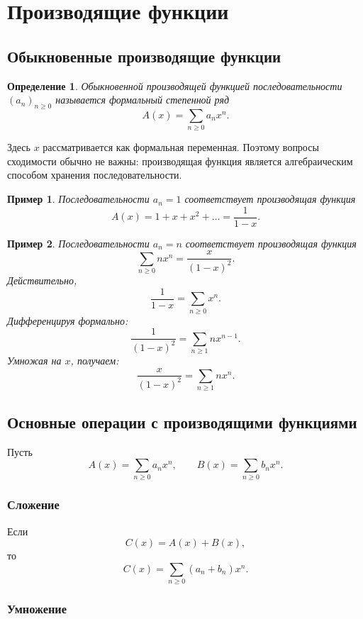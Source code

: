 \documentclass[12pt,a4paper]{article}
\newtheorem{definition}{Определение}
\newtheorem{example}{Пример}
\begin{document}
\section{Производящие функции}

\subsection{Обыкновенные производящие функции}

\begin{definition}
Обыкновенной производящей функцией последовательности $(a_n)_{n\ge 0}$ называется формальный степенной ряд
\[
A(x) = \sum_{n\ge 0} a_n x^n.
\]
\end{definition}

Здесь $x$ рассматривается как формальная переменная. Поэтому вопросы сходимости обычно не важны: производящая функция является алгебраическим способом хранения последовательности.

\begin{example}
Последовательности $a_n=1$ соответствует производящая функция
\[
A(x)=1+x+x^2+\dots=\frac{1}{1-x}.
\]
\end{example}

\begin{example}
Последовательности $a_n=n$ соответствует производящая функция
\[
\sum_{n\ge 0} n x^n = \frac{x}{(1-x)^2}.
\]
Действительно,
\[
\frac{1}{1-x}=\sum_{n\ge 0}x^n.
\]
Дифференцируя формально:
\[
\frac{1}{(1-x)^2}=\sum_{n\ge 1} n x^{n-1}.
\]
Умножая на $x$, получаем:
\[
\frac{x}{(1-x)^2}=\sum_{n\ge 1} n x^n.
\]
\end{example}

\subsection{Основные операции с производящими функциями}

Пусть
\[
A(x)=\sum_{n\ge 0}a_nx^n,\qquad B(x)=\sum_{n\ge 0}b_nx^n.
\]

\subsubsection{Сложение}

Если
\[
C(x)=A(x)+B(x),
\]
то
\[
C(x)=\sum_{n\ge 0}(a_n+b_n)x^n.
\]

\subsubsection{Умножение}
\end{document}
